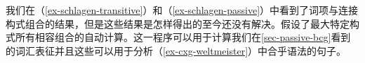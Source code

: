 我们在（\ref{ex-schlagen-transitive}）和（\ref{ex-schlagen-passive}）中看到了词项与连接构式组合的结果，但是这些结果是怎样得出的至今还没有解决。\citet{Kay2002a}假设了最大特定构式所有相容组合的自动计算。这一程序可以用于计算我们在\ref{sec-passive-bcg}看到的词汇表征并且这些可以用于分析（\ref{ex-cxg-weltmeister}）中合乎语法的句子。

